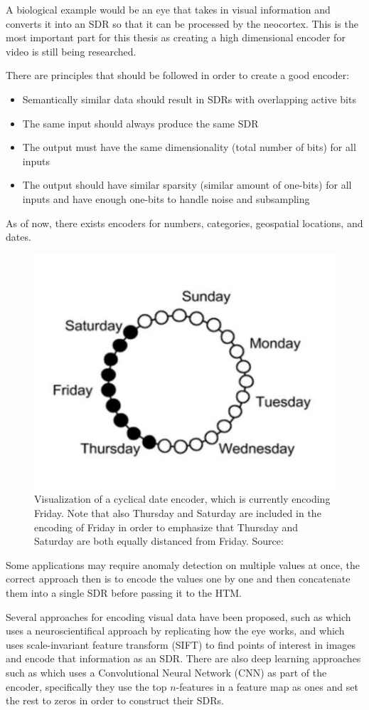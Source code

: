A biological example would be an eye that takes in visual information and converts it into an SDR so that it can be processed by the neocortex. This is the most important part for this thesis as creating a high dimensional encoder for video is still being researched.\par
There are principles that should be followed in order to create a good encoder:
\begin{itemize}
    \item Semantically similar data should result in SDRs with overlapping active bits
    \item The same input should always produce the same SDR
    \item The output must have the same dimensionality (total number of bits) for all inputs
    \item The output should have similar sparsity (similar amount of one-bits) for all inputs and have enough one-bits to handle noise and subsampling
\end{itemize}
As of now, there exists encoders for numbers, categories, geospatial locations, and dates.
\begin{figure}[H]
    \centering
    \includegraphics[width=0.55\linewidth]{resources/related_works/cyclical_encoder.png}
    \caption{Visualization of a cyclical date encoder, which is currently encoding Friday. Note that also Thursday and Saturday are included in the encoding of Friday in order to emphasize that Thursday and Saturday are both equally distanced from Friday. Source: \cite{BAMI}}
    \label{fig:cyclical_encoder}
\end{figure}
Some applications may require anomaly detection on multiple values at once, the correct approach then is to encode the values one by one and then concatenate them into a single SDR before passing it to the HTM.
\par
Several approaches for encoding visual data have been proposed, such as \cite{eyeencoder} which uses a neuroscientifical approach by replicating how the eye works, and \cite{ObjectDetectionSIFT} which uses scale-invariant feature transform (SIFT) to find points of interest in images and encode that information as an SDR. There are also deep learning approaches such as \cite{CNN_HTM} which uses a Convolutional Neural Network (CNN) as part of the encoder, specifically they use the top $n$-features in a feature map as ones and set the rest to zeros in order to construct their SDRs.
